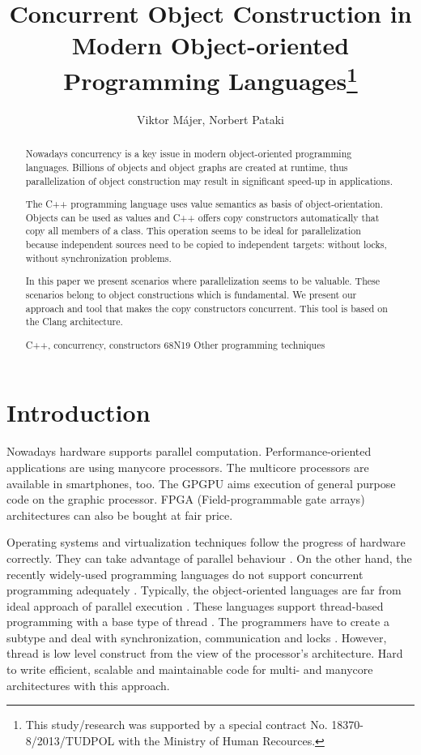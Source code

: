 \documentclass{article}
\title{Concurrent Object Construction in Modern Object-oriented Programming
Languages\thanks{This study/research was supported by a special contract No. 18370-8/2013/TUDPOL with the Ministry of Human Recources.}}
\author{Viktor M\'ajer\inst1, Norbert Pataki\inst2}
\institute{\inst1EPAM System European Headquarters, Budapest\\\url{Viktor_Majer@epam.com}\\
           \inst2Dept. of Programming Languages and Compilers, \\ 
Fac. of Informatics, E\"otv\"os Lor\'and University, Budapest\\\url{patakino@elte.hu}}
\begin{document}
\maketitle

\begin{abstract}
Nowadays concurrency is a key issue in modern object-oriented programming
languages. Billions of objects and object graphs are created at runtime,
thus parallelization of object construction may result in significant
speed-up in applications.

The C++ programming language uses value semantics as basis of
object-orientation. Objects can be used as values and C++ offers copy
constructors automatically that copy all members of a class. This operation
seems to be ideal for parallelization because independent sources need to be
copied to independent targets: without locks, without synchronization problems.

In this paper we present scenarios where parallelization seems to
be valuable. These scenarios belong to object constructions which is fundamental. 
We present our approach and tool that makes the copy constructors concurrent.
This tool is based on the Clang architecture.

\keywords C++, concurrency, constructors
\AMSclassificationnumber 68N19 Other programming techniques
\end{abstract}

\section{Introduction}

Nowadays hardware supports parallel computation. Performance-oriented applications are using
manycore processors. The multicore processors are available in smartphones, too. The GPGPU
aims execution of general purpose code on the graphic processor. FPGA (Field-programmable
gate  arrays) architectures can also be bought at fair price.

Operating systems and virtualization techniques follow the progress of hardware correctly. 
They can take advantage of parallel behaviour \cite{barham:virtualization}. On the other
hand, the recently widely-used programming languages do not support concurrent programming
adequately \cite{lupin:highlevel}. Typically, the object-oriented languages are far from
ideal approach of parallel execution \cite{tripathi:sina}. These languages support
thread-based programming with a base type of thread \cite{oaks:thread}. The programmers have
to create a subtype and deal with synchronization, communication and locks \cite{hughes:thread}.
However, thread is low level construct from the view of the processor's architecture. Hard to
write efficient, scalable and maintainable code for multi- and manycore  architectures with 
this approach.
\end{document}
